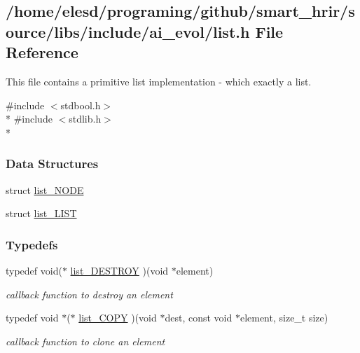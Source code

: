 \hypertarget{a00010}{\subsection{/home/elesd/programing/github/smart\-\_\-hrir/source/libs/include/ai\-\_\-evol/list.h File Reference}
\label{a00010}
}


This file contains a primitive list implementation -\/ which exactly a list.  


{\ttfamily \#include $<$stdbool.\-h$>$}\\*
{\ttfamily \#include $<$stdlib.\-h$>$}\\*
\subsubsection*{Data Structures}
\begin{DoxyCompactItemize}
\item 
struct \hyperlink{a00005}{list\-\_\-\-N\-O\-D\-E}
\item 
struct \hyperlink{a00004}{list\-\_\-\-L\-I\-S\-T}
\end{DoxyCompactItemize}
\subsubsection*{Typedefs}
\begin{DoxyCompactItemize}
\item 
typedef void($\ast$ \hyperlink{a00010_af9f798ca7814dd1b5ef32b7ecfa7462f}{list\-\_\-\-D\-E\-S\-T\-R\-O\-Y} )(void $\ast$element)
\begin{DoxyCompactList}\small\item\em callback function to destroy an element \end{DoxyCompactList}\item 
typedef void $\ast$($\ast$ \hyperlink{a00010_a17ecf184324f5152136d35a721def4b3}{list\-\_\-\-C\-O\-P\-Y} )(void $\ast$dest, const void $\ast$element, size\-\_\-t size)
\begin{DoxyCompactList}\small\item\em callback function to clone an element \end{DoxyCompactList}\end{DoxyCompactItemize}
